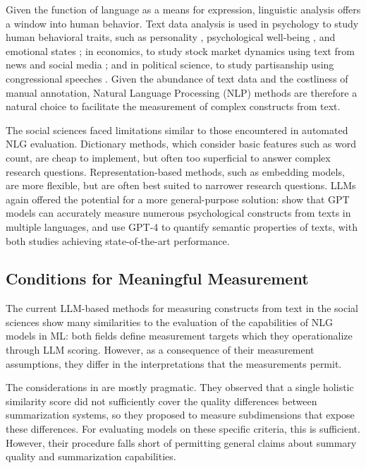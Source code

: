 Given the function of language as a means for expression, linguistic analysis offers a window into human behavior. Text data analysis is used in psychology to study human behavioral traits, such as personality \citep{boydLanguagebasedPersonalityNew2017}, psychological well-being \citep{guntukuDetectingDepressionMental2017}, and emotional states \citep{kahnMeasuringEmotionalExpression2007}; in economics, to study stock market dynamics using text from news and social media \citep{manelaNewsImpliedVolatility2017}; and in political science, to study partisanship using congressional speeches \citep{gentzkowMeasuringGroupDifferences2019}. Given the abundance of text data and the costliness of manual annotation, Natural Language Processing (NLP) methods are therefore a natural choice to facilitate the measurement of complex constructs from text.

The social sciences faced limitations similar to those encountered in automated NLG evaluation. Dictionary methods, which consider basic features such as word count, are cheap to implement, but often too superficial to answer complex research questions. Representation-based methods, such as embedding models, are more flexible, but are often best suited to narrower research questions. LLMs again offered the potential for a more general-purpose solution: \citet{rathjeGPTEffectiveTool2024} show that GPT models can accurately measure numerous psychological constructs from texts in multiple languages, and \citet{lemensUncoveringSemanticsConcepts2023} use GPT-4 to quantify semantic properties of texts, with both studies achieving state-of-the-art performance.


\subsection{Conditions for Meaningful Measurement}

The current LLM-based methods for measuring constructs from text in the social sciences show many similarities to the evaluation of the capabilities of NLG models in ML: both fields define measurement targets which they operationalize through LLM scoring. However, as a consequence of their measurement assumptions, they differ in the interpretations that the measurements permit.

The considerations in \citet{fabbri_summeval_2021} are mostly pragmatic. They observed that a single holistic similarity score did not sufficiently cover the quality differences between summarization systems, so they proposed to measure subdimensions that expose these differences. For evaluating models on these specific criteria, this is sufficient. However, their procedure falls short of permitting general claims about summary quality and summarization capabilities. 


